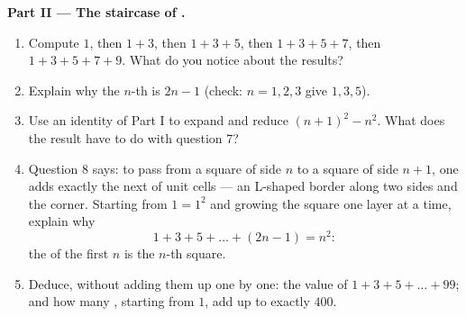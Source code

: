 \begin{problem}[{Weekend problem --- $(a+b)^2$, $(a-b)^2$,
$(a+b)(a-b)$, and the sum $1 + 3 + 5 + \dots + (2n-1) = n^2$}]
\medskip
\noindent\textbf{Part II --- The staircase of .}
\begin{enumerate}[resume]
  \item Compute $1$, then $1 + 3$, then $1 + 3 + 5$, then
        $1 + 3 + 5 + 7$, then $1 + 3 + 5 + 7 + 9$. What do you
        notice about the results?
  \item Explain why the $n$-th  is $2n - 1$ (check:
        $n = 1, 2, 3$ give $1, 3, 5$).
  \item Use an identity of Part I to expand and reduce
        $(n + 1)^2 - n^2$. What does the result have to do with
        question 7?
  \item Question 8 says: to pass from a square of side $n$ to a
        square of side $n + 1$, one adds exactly the next  of unit cells --- an L-shaped border along two
        sides and the corner. Starting from $1 = 1^2$ and growing
        the square one layer at a time, explain why
        \[
        1 + 3 + 5 + \dots + (2n - 1) = n^2 :
        \]
        the  of the first $n$  is the $n$-th square.
  \item Deduce, without adding them up one by one: the value of
        $1 + 3 + 5 + \dots + 99$; and how many , starting
        from $1$, add up to exactly $400$.
\end{enumerate}


\end{problem}
